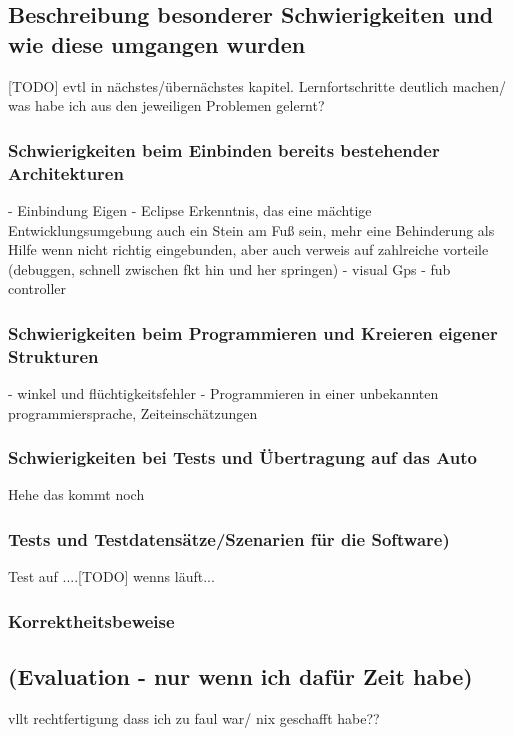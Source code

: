 \subsection{Beschreibung besonderer Schwierigkeiten und wie diese umgangen wurden}
[TODO] evtl in nächstes/übernächstes kapitel. Lernfortschritte deutlich machen/ was habe ich aus den jeweiligen Problemen gelernt?

\subsubsection{Schwierigkeiten beim Einbinden bereits bestehender Architekturen}
 - Einbindung Eigen
 - Eclipse
 Erkenntnis, das eine mächtige Entwicklungsumgebung auch ein Stein am Fuß sein, mehr eine Behinderung als Hilfe wenn nicht richtig eingebunden, aber auch verweis auf zahlreiche vorteile (debuggen, schnell zwischen fkt hin und her springen)
 - visual Gps
 - fub controller
 
\subsubsection{Schwierigkeiten beim Programmieren und Kreieren eigener Strukturen}
- winkel und flüchtigkeitsfehler
- Programmieren in einer unbekannten programmiersprache, Zeiteinschätzungen
\subsubsection{Schwierigkeiten bei Tests und Übertragung auf das Auto}
	Hehe das kommt noch
\subsubsection{Tests und Testdatensätze/Szenarien für die Software)}
Test auf ....[TODO] wenns läuft...
\subsubsection{Korrektheitsbeweise}
\subsection{(Evaluation - nur wenn ich dafür Zeit habe)}
vllt rechtfertigung dass ich zu faul war/ nix geschafft habe??